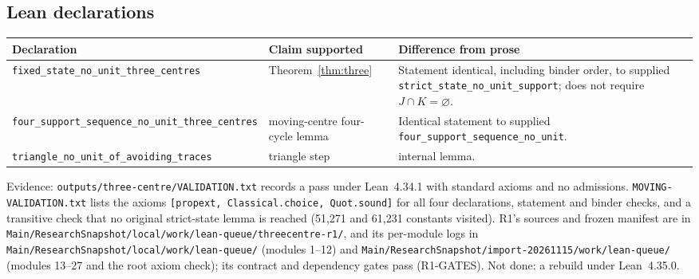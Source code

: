 \documentclass[11pt]{article}
\theoremstyle{definition}
\theoremstyle{remark}
\begin{document}
\subsection{Lean declarations}
\begin{center}\small
\begin{tabularx}{\linewidth}{@{}l X X@{}}
\toprule
Declaration & Claim supported & Difference from prose\\
\midrule
\texttt{fixed\_\allowbreak{}state\_\allowbreak{}no\_\allowbreak{}unit\_\allowbreak{}three\_\allowbreak{}centres} & Theorem~\ref{thm:three} & Statement identical, including binder order, to supplied \texttt{strict\_\allowbreak{}state\_\allowbreak{}no\_\allowbreak{}unit\_\allowbreak{}support}; does not require $J\cap K=\varnothing$.\\
\texttt{four\_\allowbreak{}support\_\allowbreak{}sequence\_\allowbreak{}no\_\allowbreak{}unit\_\allowbreak{}three\_\allowbreak{}centres} & moving-centre four-cycle lemma & Identical statement to supplied \texttt{four\_\allowbreak{}support\_\allowbreak{}sequence\_\allowbreak{}no\_\allowbreak{}unit}.\\
\texttt{triangle\_\allowbreak{}no\_\allowbreak{}unit\_\allowbreak{}of\_\allowbreak{}avoiding\_\allowbreak{}traces} & triangle step & internal lemma.\\
\bottomrule
\end{tabularx}
\end{center}
\noindent Evidence: \texttt{outputs/\allowbreak{}three-\allowbreak{}centre/\allowbreak{}VALIDATION.\allowbreak{}txt} records a pass under Lean~4.34.1 with standard axioms and no admissions. \texttt{MOVING-\allowbreak{}VALIDATION.\allowbreak{}txt} lists the axioms \texttt{[propext, Classical.\allowbreak{}choice, Quot.\allowbreak{}sound]} for all four declarations, statement and binder checks, and a transitive check that no original strict-state lemma is reached (51,271 and 61,231 constants visited). R1's sources and frozen manifest are in \texttt{Main/\allowbreak{}ResearchSnapshot/\allowbreak{}local/\allowbreak{}work/\allowbreak{}lean-\allowbreak{}queue/\allowbreak{}threecentre-\allowbreak{}r1/}, and its per-module logs in \texttt{Main/\allowbreak{}ResearchSnapshot/\allowbreak{}local/\allowbreak{}work/\allowbreak{}lean-\allowbreak{}queue/\allowbreak{}} (modules 1--12) and \texttt{Main/\allowbreak{}ResearchSnapshot/\allowbreak{}import-\allowbreak{}20261115/\allowbreak{}work/\allowbreak{}lean-\allowbreak{}queue/\allowbreak{}} (modules 13--27 and the root axiom check); its contract and dependency gates pass (R1-GATES). Not done: a rebuild under Lean~4.35.0.
\end{document}
